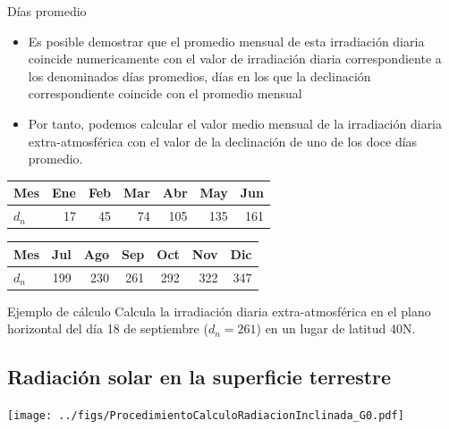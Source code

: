 \documentclass[xcolor={usenames,svgnames,dvipsnames}]{beamer}
\begin{document}
\begin{frame}[label={sec:org0f4a45e}]{Días promedio}
\begin{itemize}
\item Es posible demostrar que el \alert{promedio mensual} de esta irradiación
diaria \alert{coincide numericamente} con el valor de irradiación diaria
correspondiente a los denominados \alert{días promedios}, días en los que
la declinación correspondiente coincide con el promedio mensual

\item Por tanto, podemos calcular el valor medio mensual de la irradiación
diaria extra-atmosférica con el valor de la declinación de uno de los
doce días promedio.
\end{itemize}

\begin{center}
\begin{tabular}{lrrrrrr}
Mes & Ene & Feb & Mar & Abr & May & Jun\\
\hline
\(d_n\) & 17 & 45 & 74 & 105 & 135 & 161\\
\end{tabular}
\end{center}

\begin{center}
\begin{tabular}{lrrrrrr}
Mes & Jul & Ago & Sep & Oct & Nov & Dic\\
\hline
\(d_n\) & 199 & 230 & 261 & 292 & 322 & 347\\
\end{tabular}
\end{center}
\end{frame}

\begin{frame}[label={sec:org1e60de3}]{Ejemplo de cálculo}
Calcula la irradiación diaria extra-atmosférica en el plano horizontal del día 18 de septiembre (\(d_n = 261\)) en un lugar de latitud 40\degree N.
\end{frame}

\subsection{Radiación solar en la superficie terrestre}
\label{sec:org4eb91e7}
\begin{frame}[label={sec:org3037797}]{}
\begin{center}
\texttt{[image: ../figs/ProcedimientoCalculoRadiacionInclinada\_G0.pdf]}
\end{center}
\end{frame}
\end{document}
